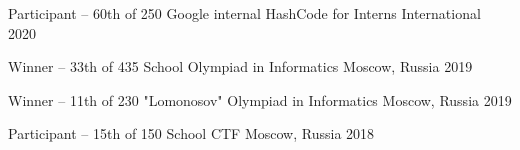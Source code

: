 



\begin{cvhonors}

  \cvhonor
    {Participant – 60th of 250} %
    {Google internal HashCode for Interns} %
    {International} %
    {2020} %

  \cvhonor
    {Winner – 33th of 435} %
    {School Olympiad in Informatics} %
    {Moscow, Russia} %
    {2019} %

  \cvhonor
    {Winner – 11th of 230} %
    {"Lomonosov" Olympiad in Informatics} %
    {Moscow, Russia} %
    {2019} %
    
  \cvhonor
    {Participant – 15th of 150} %
    {School CTF} %
    {Moscow, Russia} %
    {2018} %

\end{cvhonors}
